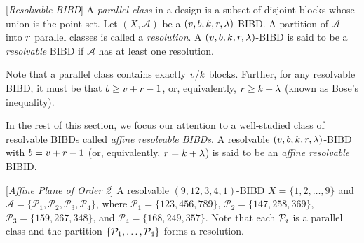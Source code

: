 \documentclass[conference,letterpaper]{IEEEtran}
\begin{document}
\begin{definition}
\label{def:resolvable-bibd}
[{\it Resolvable BIBD}] A {\it parallel class} in a design is a subset of disjoint blocks  whose union is the point set. Let $(X,\mathcal{A})$ be a $(v,b,k,r,\lambda)$-BIBD. A partition of $\mathcal{A}$ into $r$ parallel classes is called a {\it resolution}. %
A $(v,b,k,r,\lambda)$-BIBD is said to be a {\it resolvable} BIBD if $\mathcal{A}$ has at least one resolution.
\end{definition}

\begin{remark}
\label{rem:r-bibd}
Note that a parallel class contains exactly $v/k$ blocks. Further, for any resolvable BIBD, it must be that $b\geq v+r-1$, or, equivalently, $r \geq k + \lambda$ (known as Bose's inequality).
\end{remark}

In the rest of this section, we focus our attention to a well-studied class of resolvable BIBDs called {\it affine resolvable BIBDs}.
A resolvable $(v,b,k,r,\lambda)$-BIBD with $b = v + r - 1$ (or, equivalently, $r = k + \lambda$) is said to be an {\it affine resolvable} BIBID.


\begin{example}
\label{ex:affine}
[{\it Affine Plane of Order 2}] A resolvable $(9,12,3,4,1)$-BIBD $X = \{1,2,\ldots,9\}$ and $\mathcal{A} = \{\mathcal{P}_1,\mathcal{P}_2,\mathcal{P}_3,\mathcal{P}_4\}$, where $ \mathcal{P}_1 = \{123,456,789\}$, $\mathcal{P}_2=\{147,258,369\}$, $\mathcal{P}_3=\{159,267,348\}$, and $\mathcal{P}_4=\{168,249,357\}$. %
Note that each $\mathcal{P}_i$ is a parallel class and the partition $\{\mathcal{P}_1,\ldots,\mathcal{P}_4\}$ forms a resolution.
\end{example}

\end{document}
